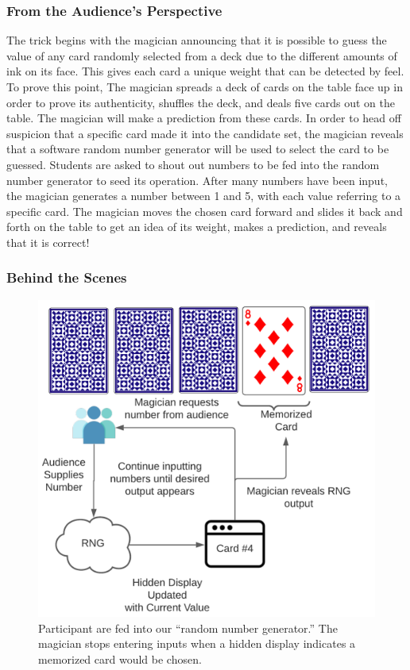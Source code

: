 \subsubsection{From the Audience's Perspective}

The trick begins with the magician announcing that it is possible to
guess the value of any card randomly selected from a deck due to the different amounts of ink on its face.
This gives each card
a unique
weight that can be detected by feel.
To prove this point,
The magician spreads a deck of cards on the table face up
in order to prove its authenticity,
shuffles the deck,
and deals five cards out on the table.
The magician will make a prediction from these cards.
In order to head off suspicion that a specific card made it into the candidate set, the magician reveals that
a software random number generator will be used to select the card to be
guessed.
Students are asked to shout out numbers to be fed into the random number
generator to seed its operation.  After many numbers have been input, the
magician generates a number between 1 and 5, with each value referring to a
specific card.  The magician moves the chosen card forward and slides it back
and forth on the table to get an idea of its weight,  makes
a prediction, and reveals that it is correct!

\subsubsection{Behind the Scenes}

\begin{figure}[H]
\centering
\includegraphics[scale=.6]{images/Trick3}
\caption{Participant are fed into our ``random number generator.''  The magician stops entering inputs
when a hidden display indicates a memorized card would be chosen.}
\label{fig:trick3}
\end{figure}

